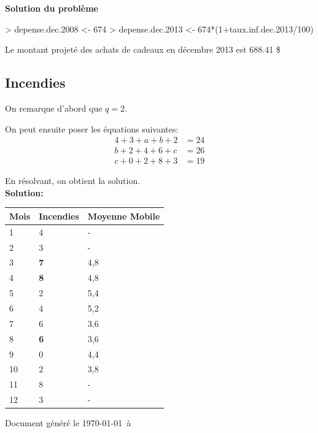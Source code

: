 \documentclass{article}
\begin{document}
\textbf{Solution du problème}
\begin{Schunk}
\begin{Sinput}
> depense.dec.2008 <- 674
> depense.dec.2013 <- 674*(1+taux.inf.dec.2013/100)
\end{Sinput}
\end{Schunk}
Le montant projeté des achats de cadeaux en décembre 2013 est 688.41 \$

\clearpage 
\subsection{Incendies}

On remarque d'abord que $q=2$.

On peut ensuite poser les équations suivantes:
\begin{align}
  \label{eq:1}
  4+3+a+b+2 &= 24\\
  b+2+4+6+c &= 26\\
  c+0+2+8+3 &= 19
\end{align}

En résolvant, on obtient la solution.\\

\textbf{Solution:}\\

\begin{tabular}{|l|l|l|}
\hline
\multicolumn{1}{|l|}{Mois} & \multicolumn{1}{l|}{Incendies} & \multicolumn{1}{l|}{Moyenne Mobile} \\ \hline
1 & 4 & \multicolumn{1}{l|}{-} \\ \hline
2 & 3 & \multicolumn{1}{l|}{-} \\ \hline
3 & \textbf{7} & 4,8 \\ \hline
4 & \textbf{8} & 4,8 \\ \hline
5 & 2 & 5,4 \\ \hline
6 & 4 & 5,2 \\ \hline
7 & 6 & 3,6 \\ \hline
8 & \textbf{6} & 3,6 \\ \hline
9 & 0  & 4,4 \\ \hline
10 & 2 & 3,8 \\ \hline
11 & 8 & \multicolumn{1}{l|}{-} \\ \hline
12 & 3 & \multicolumn{1}{l|}{-} \\ \hline
\end{tabular}

\clearpage

Document généré le \today \ à \ \thistime 
\end{document}
